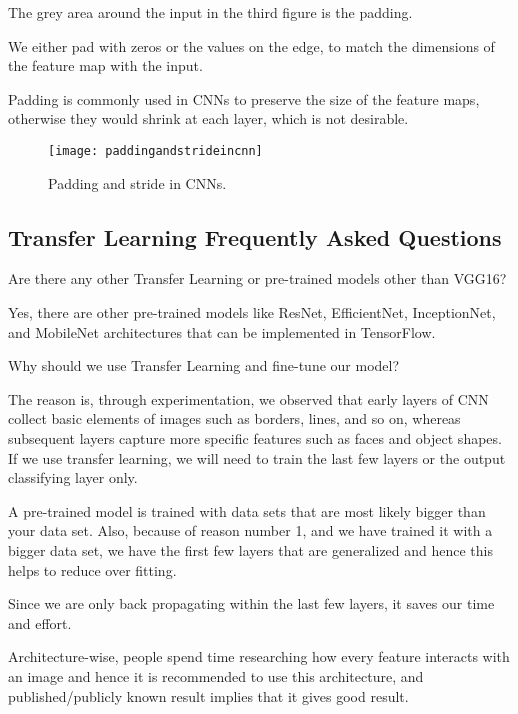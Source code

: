 	\begin{bulletedlist}
		\item The grey area around the input in the third figure is the padding.
		\item We either pad with zeros or the values on the edge, to match the dimensions of the feature map with the input.
		\item Padding is commonly used in CNNs to preserve the size of the feature maps, otherwise they would shrink at each layer, which is not desirable.
	\end{bulletedlist}

	\begin{figure}[htb]
		\centering
		\texttt{[image: paddingandstrideincnn]}
		\caption[Padding and stride in CNNs]{Padding and stride in CNNs.}
		\label{fig:paddingandstrideincnn}
	\end{figure}


	\subsection{Transfer Learning Frequently Asked Questions}
	\begin{qanda}
		\begin{question}
Are there any other Transfer Learning or pre-trained models other than VGG16?
		\end{question}
		\begin{answer}
Yes, there are other pre-trained models like ResNet, EfficientNet, InceptionNet, and MobileNet architectures that can be implemented in TensorFlow.
		\end{answer}
	\end{qanda}

	\begin{qanda}
		\begin{question}
Why should we use Transfer Learning and fine-tune our model?
		\end{question}
		\begin{answer}
The reason is, through experimentation, we observed that early layers of CNN collect basic elements of images such as borders, lines, and so on, whereas subsequent layers capture more specific features such as faces and object shapes. If we use transfer learning, we will need to train the last few layers or the output classifying layer only.

A pre-trained model is trained with data sets that are most likely bigger than your data set. Also, because of reason number 1, and we have trained it with a bigger data set, we have the first few layers that are generalized and hence this helps to reduce over fitting.

Since we are only back propagating within the last few layers, it saves our time and effort.

Architecture-wise, people spend time researching how every feature interacts with an image and hence it is recommended to use this architecture, and published/publicly known result implies that it gives good result.
		\end{answer}
	\end{qanda}

